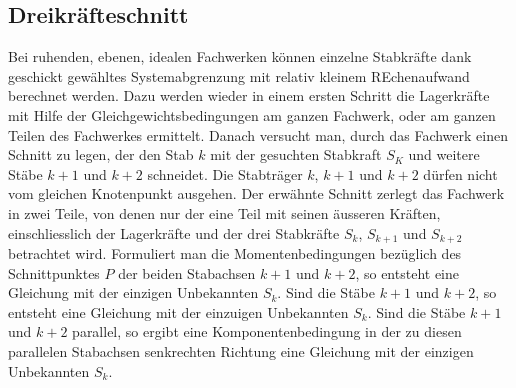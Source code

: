 \subsection{Dreikräfteschnitt}
Bei ruhenden, ebenen, idealen Fachwerken können einzelne Stabkräfte dank geschickt gewähltes Systemabgrenzung mit relativ kleinem REchenaufwand berechnet werden. Dazu werden wieder in einem ersten Schritt die Lagerkräfte mit Hilfe der Gleichgewichtsbedingungen am ganzen Fachwerk, oder am ganzen Teilen des Fachwerkes ermittelt.
\newline\newline
Danach versucht man, durch das Fachwerk einen Schnitt zu legen, der den Stab $k$ mit der gesuchten Stabkraft $S_K$ und weitere Stäbe $k+1$ und $k+2$ schneidet. Die Stabträger $k$, $k+1$ und $k+2$ dürfen nicht vom gleichen Knotenpunkt ausgehen. Der erwähnte Schnitt zerlegt das Fachwerk in zwei Teile, von denen nur der eine Teil mit seinen äusseren Kräften, einschliesslich der Lagerkräfte und der drei Stabkräfte $S_k$, $S_{k+1}$ und $S_{k+2}$ betrachtet wird.  
\newline\newline
Formuliert man die Momentenbedingungen bezüglich des Schnittpunktes $P$ der beiden Stabachsen $k+1$ und $k+2$, so entsteht eine Gleichung mit der einzigen Unbekannten $S_k$. Sind die Stäbe $k+1$ und $k+2$, so entsteht eine Gleichung mit der einzuigen Unbekannten $S_k$. Sind die Stäbe $k+1$ und $k+2$ parallel, so ergibt eine Komponentenbedingung in der zu diesen parallelen Stabachsen senkrechten Richtung eine Gleichung mit der einzigen Unbekannten $S_k$.
